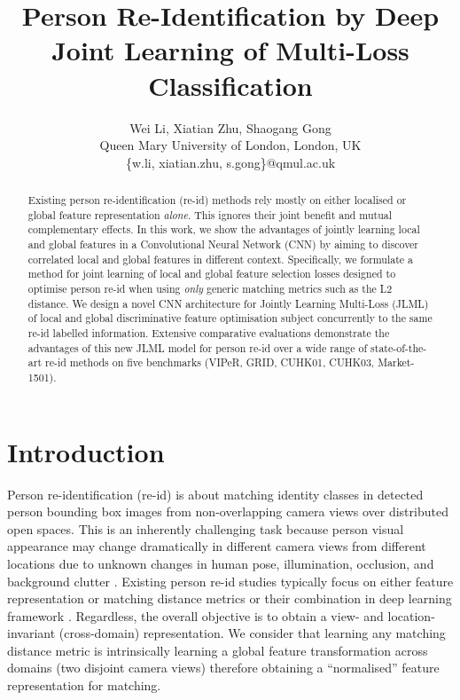 \documentclass{article}
\title{Person Re-Identification by Deep Joint Learning of Multi-Loss Classification}
\author{Wei Li, Xiatian Zhu, Shaogang Gong\\ 
	Queen Mary University of London, London, UK  \\
	\{w.li, xiatian.zhu, s.gong\}@qmul.ac.uk}
\begin{document}
\maketitle

\begin{abstract}
	Existing person re-identification (re-id) methods 
	rely mostly on either localised or global feature
	representation {\em alone}. This ignores their joint benefit
	and mutual complementary effects. In this work, we show the
	advantages of jointly learning local and global features
	in a Convolutional Neural Network (CNN) by aiming
	to discover correlated local and global features in different context. Specifically, we
	formulate a method for joint learning of local and global
	feature selection losses designed to optimise person re-id when
	using {\em only} generic matching metrics such as the L2 distance.
	We design a novel CNN architecture for Jointly Learning
	Multi-Loss (JLML) of local and global discriminative feature optimisation subject
	concurrently to the same re-id labelled information. Extensive
	comparative evaluations demonstrate the advantages of this new
	JLML model for person re-id over a wide range of
	state-of-the-art re-id methods on five benchmarks (VIPeR, GRID,
	CUHK01, CUHK03, Market-1501). 
\end{abstract}





\section{Introduction}

Person re-identification (re-id) is about matching identity classes in
detected person bounding box images from non-overlapping camera views
over distributed open spaces.
This is an inherently challenging task because person visual
appearance may change dramatically in different camera views from
different locations due to unknown changes in human pose,
illumination, occlusion, and background clutter \cite{gong2014person}.
Existing person re-id studies typically focus on either feature representation
\cite{ELF_ECCV08,SDALF_CVPR10,colorInvariants,SalienceReId_CVPR13,liao2015person,GOG,ma2017person} or 
matching distance metrics
\cite{KISSME_CVPR12,xiong2014person,PRDC,wang2014person,Anton_2015_CoRR,zhang2016learning,wang2016highly,wang2016human,wang2016pami,chen2017person}
or their combination in deep learning framework
\cite{li2014deepreid,ahmed2015improved,wangjoint,xiao2016learning,subramaniam2016deep,chen2016multi}.
Regardless, the overall objective is to 
obtain a view- and location-invariant (cross-domain) representation. We consider
that learning any matching distance metric is intrinsically learning a
global feature transformation across domains (two disjoint camera
views) therefore obtaining a ``normalised'' feature representation for
matching. 
\end{document}
